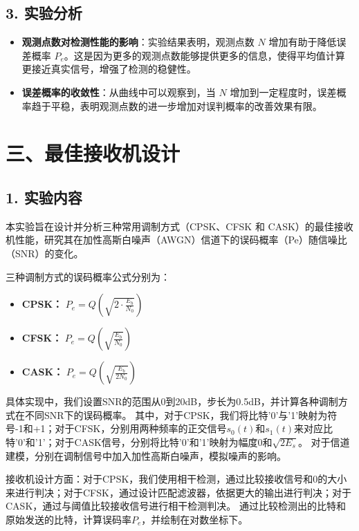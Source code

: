 \documentclass[12pt]{ctexart}
\begin{document}
\subsection*{3. 实验分析}

\begin{itemize}
    \item \textbf{观测点数对检测性能的影响}：实验结果表明，观测点数 \( N \) 增加有助于降低误差概率 \( P_e \)。这是因为更多的观测点数能够提供更多的信息，使得平均值计算更接近真实信号，增强了检测的稳健性。
    \item \textbf{误差概率的收敛性}：从曲线中可以观察到，当 \( N \) 增加到一定程度时，误差概率趋于平稳，表明观测点数的进一步增加对误判概率的改善效果有限。
\end{itemize}


\section*{三、最佳接收机设计}

\subsection*{1. 实验内容}

本实验旨在设计并分析三种常用调制方式（CPSK、CFSK 和 CASK）的最佳接收机性能，研究其在加性高斯白噪声（AWGN）信道下的误码概率（Pe）随信噪比（SNR）的变化。

三种调制方式的误码概率公式分别为：

\begin{itemize}
    \item \textbf{CPSK：} $P_e = Q\left( \sqrt{2 \cdot \frac{E_b}{N_0}} \right)$
    \item \textbf{CFSK：} $P_e = Q\left( \sqrt{\frac{E_b}{N_0}} \right)$
    \item \textbf{CASK：} $P_e = Q\left( \sqrt{\frac{E_b}{2N_0}} \right)$
\end{itemize}

具体实现中，我们设置SNR的范围从0到20dB，步长为0.5dB，并计算各种调制方式在不同SNR下的误码概率。
其中，对于CPSK，我们将比特'0'与'1'映射为符号-1和+1；对于CFSK，分别用两种频率的正交信号\(s_0(t)\)和\(s_1(t)\)来对应比特'0'和'1'；对于CASK信号，分别将比特'0'和'1'映射为幅度0和\(\sqrt{2E_s}\)。
对于信道建模，分别在调制信号中加入加性高斯白噪声，模拟噪声的影响。

接收机设计方面：对于CPSK，我们使用相干检测，通过比较接收信号和0的大小来进行判决；对于CFSK，通过设计匹配滤波器，依据更大的输出进行判决；对于CASK，通过与阈值比较接收信号进行相干检测判决。
通过比较检测出的比特和原始发送的比特，计算误码率\(P_e\)，并绘制在对数坐标下。
\end{document}
